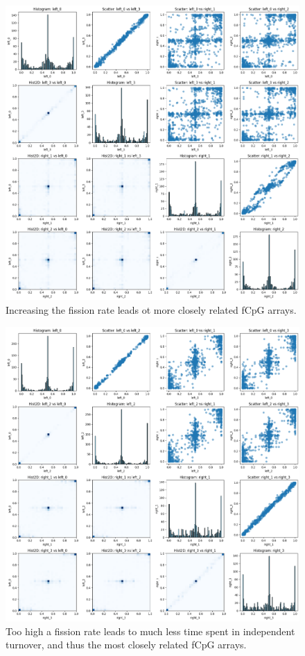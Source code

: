 \begin{figure}[h]
    \centering
    \includegraphics[width=\textwidth]{Chapter_4/figures/inter-gland-sens/med-plot.png}
    \caption{Increasing the fission rate leads ot more closely related fCpG
    arrays.}
    \label{fig:inter-med}
\end{figure}

\begin{figure}[h]
    \centering
    \includegraphics[width=\textwidth]{Chapter_4/figures/inter-gland-sens/fast-plot.png}
    \caption{Too high a fission rate leads to much less time spent in
    independent turnover, and thus the most closely related fCpG arrays.}
    \label{fig:inter-fast}
\end{figure}

